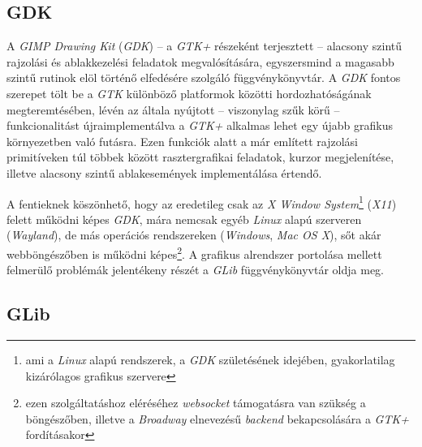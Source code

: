 \subsection{GDK}
\label{sec:gdk}

A \textit{GIMP Drawing Kit} (\textit{GDK}) -- a \textit{GTK+} részeként terjesztett -- alacsony szintű rajzolási és ablakkezelési feladatok megvalósítására, egyszersmind a magasabb szintű rutinok elöl történő elfedésére szolgáló függvénykönyvtár. A \textit{GDK }fontos szerepet tölt be a \textit{GTK} különböző platformok közötti hordozhatóságának megteremtésében, lévén az általa nyújtott -- viszonylag szűk körű -- funkcionalitást újraimplementálva a \textit{GTK+} alkalmas lehet egy újabb grafikus környezetben való futásra. Ezen funkciók alatt a már említett rajzolási primitíveken túl többek között rasztergrafikai feladatok, kurzor megjelenítése, illetve alacsony szintű ablakesemények implementálása értendő.

A fentieknek köszönhető, hogy az eredetileg csak az \textit{X Window System}\footnote{ami a \textit{Linux} alapú rendszerek, a \textit{GDK} születésének idejében, gyakorlatilag kizárólagos grafikus szervere} (\textit{X11}) felett működni képes \textit{GDK}, mára nemcsak egyéb \textit{Linux} alapú szerveren (\textit{Wayland}), de más operációs rendszereken (\textit{Windows}, \textit{Mac OS X}), sőt akár webböngészőben is működni képes\footnote{ezen szolgáltatáshoz eléréséhez \textit{websocket} támogatásra van szükség a böngészőben, illetve a \textit{Broadway} elnevezésű \textit{backend} bekapcsolására a \textit{GTK+} fordításakor}. A grafikus alrendszer portolása mellett felmerülő problémák jelentékeny részét a \textit{GLib} függvénykönyvtár oldja meg.

\subsection{GLib}


